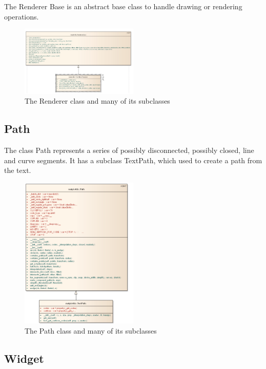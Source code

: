 \documentclass[pdftex,10pt,a4paper]{report}
\begin{document}
The Renderer Base is an abstract base class to handle drawing or rendering operations.


\begin{figure}[ht!]
        \centering
                \includegraphics[width=0.5\textwidth]{img/umls/candy/Renderer}
        \caption{The Renderer class and many of its subclasses}
\end{figure}

\subsection{Path}

The class Path represents a series of possibly disconnected, possibly closed, line and curve segments. It has a subclass TextPath, which used to create a path from the text.


\begin{figure}[ht!]
        \centering
                \includegraphics[width=0.5\textwidth]{img/umls/candy/Path}
        \caption{The Path class and many of its subclasses}
\end{figure}

\subsection{Widget}
\end{document}
